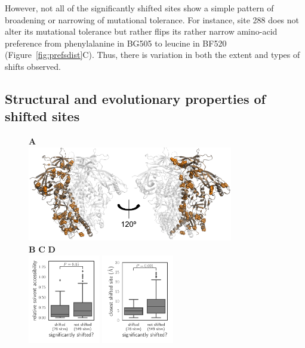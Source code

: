 \documentclass[9pt]{elife}
\begin{document}
However, not all of the significantly shifted sites show a simple pattern of broadening or narrowing of mutational tolerance.
For instance, site 288 does not alter its mutational tolerance but rather flips its rather narrow amino-acid preference from phenylalanine in BG505 to leucine in BF520 (Figure~\ref{fig:prefsdist}C).
Thus, there is variation in both the extent and types of shifts observed.

\subsection{Structural and evolutionary properties of shifted sites}

\begin{figure}
{\bf \Large A} \\
\includegraphics[width=0.8\textwidth]{figures/shifts_on_structure/shifts_on_structure.pdf}
\\
{\bf \Large B} \hspace{0.28\textwidth} {\bf \Large C} \hspace{0.28\textwidth} {\bf \Large D} \\
\includegraphics[width=0.28\textwidth]{figures/rsa_vs_shifts.pdf}
\hspace{0.01\textwidth}
\includegraphics[width=0.28\textwidth]{figures/shifts_proximity.pdf}

\end{figure}
\end{document}
